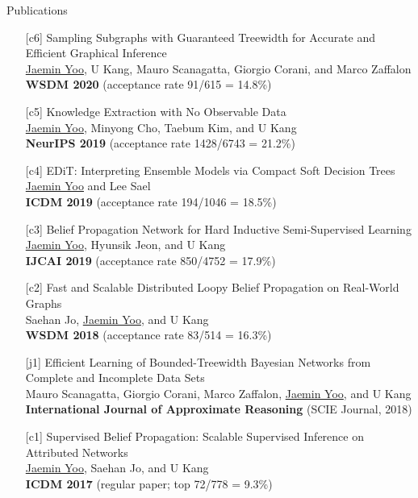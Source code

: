 \documentclass{resume} %
\begin{document}
\begin{rSection}{Publications}
\begin{enumerate}[leftmargin=*]
	\item[{[c6]}]
		Sampling Subgraphs with Guaranteed Treewidth for Accurate and Efficient Graphical Inference \\
		\underline{Jaemin Yoo}, U Kang, Mauro Scanagatta, Giorgio Corani, and Marco Zaffalon \\
		\textbf{WSDM 2020} (acceptance rate 91/615 = 14.8\%)

	\item[{[c5]}]
		Knowledge Extraction with No Observable Data \\
		\underline{Jaemin Yoo}, Minyong Cho, Taebum Kim, and U Kang \\
		\textbf{NeurIPS 2019} (acceptance rate 1428/6743 = 21.2\%)

	\item[{[c4]}]
		EDiT: Interpreting Ensemble Models via Compact Soft Decision Trees \\
		\underline{Jaemin Yoo} and Lee Sael \\
		\textbf{ICDM 2019} (acceptance rate 194/1046 = 18.5\%)

	\item[{[c3]}]
		Belief Propagation Network for Hard Inductive Semi-Supervised Learning \\
		\underline{Jaemin Yoo}, Hyunsik Jeon, and U Kang \\
		\textbf{IJCAI 2019} (acceptance rate 850/4752 = 17.9\%)

	\item[{[c2]}]
		Fast and Scalable Distributed Loopy Belief Propagation on Real-World Graphs \\
		Saehan Jo, \underline{Jaemin Yoo}, and U Kang \\
		\textbf{WSDM 2018} (acceptance rate 83/514 = 16.3\%)

	\item[{[j1]}]
		Efficient Learning of Bounded-Treewidth Bayesian Networks from Complete and Incomplete Data Sets \\
		Mauro Scanagatta, Giorgio Corani, Marco Zaffalon, \underline{Jaemin Yoo}, and U Kang \\
		\textbf{International Journal of Approximate Reasoning} (SCIE Journal, 2018)

	\item[{[c1]}]
		Supervised Belief Propagation: Scalable Supervised Inference on Attributed Networks \\
		\underline{Jaemin Yoo}, Saehan Jo, and U Kang \\
		\textbf{ICDM 2017} (regular paper; top 72/778 = 9.3\%)

\end{enumerate}
\end{rSection}
\end{document}
